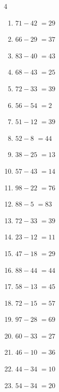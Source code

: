 \begin{multicols}{4}
\begin{enumerate}
  \item $71-42$
        $=29$

  \item $66-29$
        $=37$

  \item $83-40$
        $=43$

  \item $68-43$
        $=25$

  \item $72-33$
        $=39$

  \item $56-54$
        $=2$

  \item $51-12$
        $=39$

  \item $52-8$
        $=44$

  \item $38-25$
        $=13$

  \item $57-43$
        $=14$

  \item $98-22$
        $=76$

  \item $88-5$
        $=83$

  \item $72-33$
        $=39$

  \item $23-12$
        $=11$

  \item $47-18$
        $=29$

\columnbreak %

  \item $88-44$
        $=44$

  \item $58-13$
        $=45$

  \item $72-15$
        $=57$

  \item $97-28$
        $=69$

  \item $60-33$
        $=27$

  \item $46-10$
        $=36$

  \item $44-34$
        $=10$

  \item $54-34$
        $=20$


\end{enumerate}
\end{multicols}

